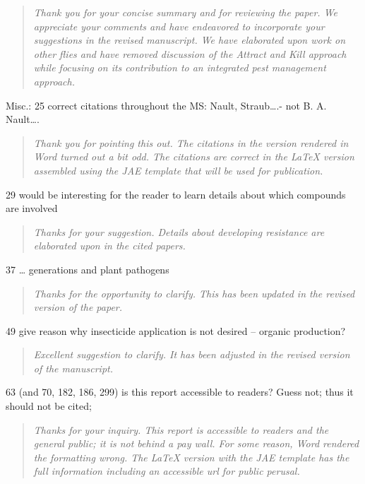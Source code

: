 \documentclass{article}
\begin{document}
\begin{quote}
    \textit{Thank you for your concise summary and for reviewing the paper.  We appreciate your comments and have endeavored to incorporate your suggestions in the revised manuscript.  We have elaborated upon work on other flies and have removed discussion of the Attract and Kill approach while focusing on its contribution to an integrated pest management approach.  }
\end{quote}

Misc.:
25 correct citations throughout the MS: Nault, Straub….-  not B. A. Nault….

\begin{quote}
    \textit{Thank you for pointing this out.  The citations in the version rendered in Word turned out a bit odd.  The citations are correct in the LaTeX version assembled using the JAE template that will be used for publication. }
\end{quote}

29 would be interesting for the reader to learn details about which compounds are involved

\begin{quote}
    \textit{Thanks for your suggestion.  Details about developing resistance are elaborated upon in the cited papers. }
\end{quote}

37 … generations and plant pathogens

\begin{quote}
    \textit{Thanks for the opportunity to clarify.  This has been updated in the revised version of the paper.  }
\end{quote}

49 give reason why insecticide application is not desired – organic production?

\begin{quote}
    \textit{Excellent suggestion to clarify.  It has been adjusted in the revised version of the manuscript. }
\end{quote}

63 (and 70, 182, 186, 299) is this report accessible to readers? Guess not; thus it should not be cited;

\begin{quote}
    \textit{Thanks for your inquiry.  This report is accessible to readers and the general public; it is not behind a pay wall.  For some reason, Word rendered the formatting wrong.  The LaTeX version with the JAE template has the full information including an accessible url for public perusal.  }
\end{quote}
\end{document}
